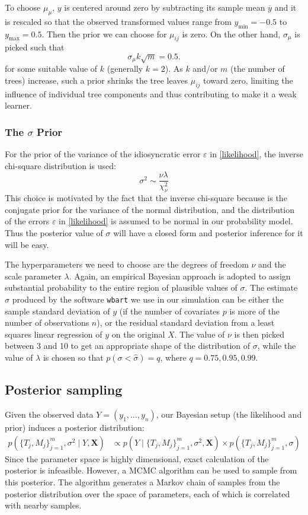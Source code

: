 \documentclass[a4paper,11pt]{article}
\begin{document}
To choose $\mu_\mu$, \( y \) is centered around zero by subtracting its sample mean $\overline{y}$ and it is rescaled so that the observed transformed values range from \( y_{\text{min}} = -0.5 \) to \( y_{\text{max}} = 0.5 \). Then the prior we can choose for $\mu_{ij}$ is zero.
On the other hand, $\sigma_\mu$ is picked such that
\[
\sigma_\mu k\sqrt{m} = 0.5.
\]
for some suitable value of $k$ (generally $k=2$).
As \(k\) and/or \(m\) (the number of trees) increase, such a prior shrinks the tree leaves \(\mu_{ij}\) toward zero, limiting the influence of individual tree components and thus contributing to make it a weak learner. 

\subsubsection{The \( \sigma \) Prior}
For the prior of the variance of the idiosyncratic error $\varepsilon$ in \eqref{likelihood}, the inverse chi-square distribution is used:
\[
\sigma^2 \sim \frac{\nu \lambda}{\chi^2_\nu} 
\]
This choice is motivated by the fact that the inverse chi-square because is the conjugate prior for the variance of the normal distribution, and the distribution of the errors $\varepsilon$ in \eqref{likelihood} is assumed to be normal in our probability model. Thus the posterior value of $\sigma$ will have a closed form and posterior inference for it will be easy. 

The hyperparameters we need to choose are the degrees of freedom $\nu$ and the scale parameter $\lambda$. Again, an empirical Bayesian approach is adopted to assign 
substantial probability to the entire region of plausible values of $\sigma$. The estimate $\hat{\sigma}$ produced by the software \texttt{wbart} we use in our simulation can be either the sample standard deviation of \( y \) (if the number of covariates $p$ is more of the number of observations $n$), or the residual standard deviation from a least squares linear regression of \( y \) on the original \( X \). 
The value of \( \nu \) is then picked between 3 and 10 to get an appropriate shape of the distribution of $\sigma$, while the value of \( \lambda \) is chosen so that \( p(\sigma < \hat{\sigma}) = q \), where $q = 0.75, 0.95, 0.99$.

\subsection{ Posterior sampling}
Given the observed data \( Y = (y_1, \ldots, y_n) \), our Bayesian setup (the likelihood and prior) induces a posterior distribution:
\[
\begin{aligned}
p\left( \{T_j, M_j\}_{j=1}^m, \sigma^2 \mid Y, \mathbf{X}\right) &\propto p\left( Y \mid \{T_j, M_j\}_{j=1}^m, \sigma^2, \mathbf{X}\right) \times p\left( \{T_j, M_j\}_{j=1}^m, \sigma \right)
\end{aligned}
\]
Since the parameter space is highly dimensional, exact calculation of the posterior is infeasible. However, a MCMC algorithm can be used to sample from this posterior. The algorithm generates a Markov chain of samples from the posterior distribution over the space of parameters, each of which is correlated with nearby samples.
\end{document}
